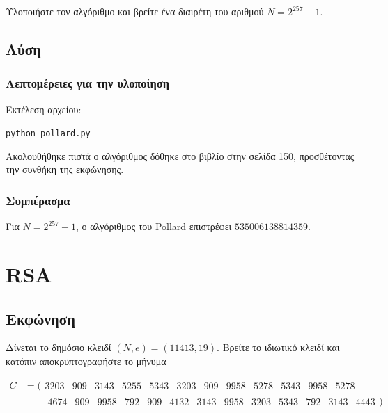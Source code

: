 \documentclass[oneside]{article}
\let\t\texttt
\begin{document}
Υλοποιήστε τον αλγόριθμο και βρείτε ένα διαιρέτη του αριθμού $N = 2^{257} - 1$.

\subsection{Λύση}

\subsubsection{Λεπτομέρειες για την υλοποίηση}

Εκτέλεση αρχείου:

\begin{center}
    \t{python pollard.py}
\end{center}

Ακολουθήθηκε πιστά ο αλγόριθμος δόθηκε στο βιβλίο \cite{draz:2022} στην σελίδα 150, προσθέτοντας την συνθήκη της εκφώνησης.

\subsubsection{Συμπέρασμα}

Για $N = 2^{257} - 1$, ο αλγόριθμος του Pollard επιστρέφει $535006138814359$.
 
\section{RSA}

\subsection{Εκφώνηση} 

Δίνεται το δημόσιο κλειδί $(N, e)=(11413, 19)$. Βρείτε το ιδιωτικό κλειδί και κατόπιν αποκρυπτογραφήστε το μήνυμα

\[  
    \begin{split}
        C &= 
        (
        \begin{matrix} 
            3203 & 909 & 3143 & 5255 & 5343 & 3203 & 909 & 9958 & 5278 & 5343 & 9958 & 5278 
        \end{matrix} \\
            &\qquad
        \begin{matrix} 
            4674 & 909 & 9958 & 792 & 909 & 4132 & 3143 & 9958 & 3203 & 5343 & 792 & 3143 & 4443
        \end{matrix}
        )
    \end{split}
\]
\end{document}
